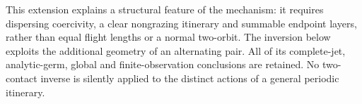 This extension explains a structural feature of the mechanism: it
requires dispersing coercivity, a clear nongrazing itinerary and summable
endpoint layers, rather than equal flight lengths or a normal two-orbit.
The inversion below exploits the additional geometry of an alternating
pair.  All of its complete-jet, analytic-germ, global and finite-observation
conclusions are retained.  No two-contact inverse is silently applied to
the distinct actions of a general periodic itinerary.
